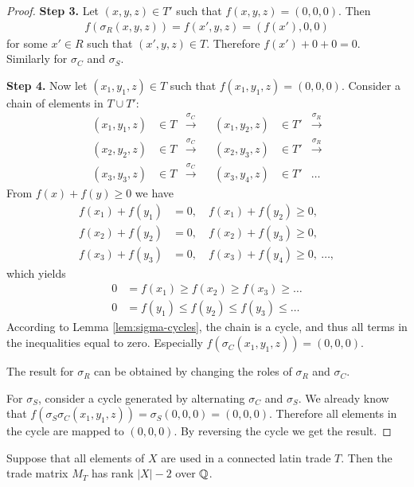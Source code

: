 \begin{proof}
%
%
\item \textbf{Step 3.}
Let $(x,y,z) \in T'$ such that $f(x,y,z) = (0,0,0)$. Then
\begin{align}
	f(\sigma_R(x,y,z)) = f(x',y,z) = (f(x'), 0, 0)
\end{align}
for some $x' \in R$ such that $(x',y,z) \in T$. Therefore $f(x') + 0 + 0 = 0$. Similarly for $\sigma_C$ and $\sigma_S$.

%
%
\item \textbf{Step 4.}
Now let $(x_1,y_1,z) \in T$ such that $f(x_1,y_1,z)=(0,0,0)$. Consider a chain of elements in $T \cup T'$:
\begin{align*}
	(x_1,y_1,z) &\in T &\xrightarrow{\sigma_C}& &(x_1,y_2,z) &\in T' & \xrightarrow{\sigma_R} \\
	(x_2,y_2,z) &\in T &\xrightarrow{\sigma_C}& &(x_2,y_3,z) &\in T' & \xrightarrow{\sigma_R} \\
	(x_3,y_3,z) &\in T &\xrightarrow{\sigma_C}& &(x_3,y_4,z) &\in T' & \dots
\end{align*}
From $f(x) + f(y) \geq 0$ we have
\begin{align*}
	f(x_1) + f(y_1) &= 0, \quad f(x_1) + f(y_2) \geq 0, \\
	f(x_2) + f(y_2) &= 0, \quad f(x_2) + f(y_3) \geq 0, \\
	f(x_3) + f(y_3) &= 0, \quad f(x_3) + f(y_4) \geq 0,\ \dots, 
\end{align*}
which yields
\begin{align*}
	0 &= f(x_1) \geq f(x_2) \geq f(x_3) \geq \dots \\
	0 &= f(y_1) \leq f(y_2) \leq f(y_3) \leq \dots
\end{align*}
According to Lemma \ref{lem:sigma-cycles}, the chain is a cycle, and thus all terms in the inequalities equal to zero. Especially $f(\sigma_C(x_1,y_1,z)) = (0,0,0)$.

The result for $\sigma_R$ can be obtained by changing the roles of $\sigma_R$ and $\sigma_C$.

For $\sigma_S$, consider a cycle generated by alternating $\sigma_C$ and $\sigma_S$. We already know that $f(\sigma_S\sigma_C(x_1,y_1,z)) = \sigma_S(0,0,0) = (0,0,0)$. Therefore all elements in the cycle are mapped to $(0,0,0)$. By reversing the cycle we get the result.

\end{proof}

\begin{cor}
\label{cor:rank-mt}
Suppose that all elements of $X$ are used in a connected latin trade $T$. Then the trade matrix $M_T$ has rank $|X|-2$ over $\mathbb Q$.
\end{cor}

